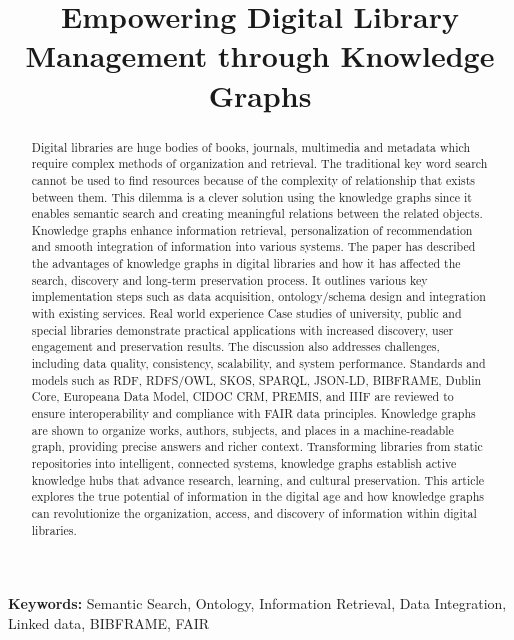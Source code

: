 \documentclass[12pt,a4paper]{article}
\title{Empowering Digital Library Management through Knowledge Graphs}
\author{}
\date{}
\begin{document}
\maketitle

\begin{abstract}
Digital libraries are huge bodies of books, journals, multimedia and metadata which require complex methods of organization and retrieval.  The traditional key word search cannot be used to find resources because of the complexity of relationship that exists between them. This dilemma is a clever solution using the knowledge graphs since it enables semantic search and creating meaningful relations between the related objects. Knowledge graphs enhance information retrieval, personalization of recommendation and smooth integration of information into various systems. The paper has described the advantages of knowledge graphs in digital libraries and how it has affected the search, discovery and long-term preservation process. It outlines various key implementation steps such as data acquisition, ontology/schema design and integration with existing services. Real world experience Case studies of university, public and special libraries demonstrate practical applications with increased discovery, user engagement and preservation results. The discussion also addresses challenges, including data quality, consistency, scalability, and system performance. Standards and models such as RDF, RDFS/OWL, SKOS, SPARQL, JSON-LD, BIBFRAME, Dublin Core, Europeana Data Model, CIDOC CRM, PREMIS, and IIIF are reviewed to ensure interoperability and compliance with FAIR data principles. Knowledge graphs are shown to organize works, authors, subjects, and places in a machine-readable graph, providing precise answers and richer context. Transforming libraries from static repositories into intelligent, connected systems, knowledge graphs establish active knowledge hubs that advance research, learning, and cultural preservation. This article explores the true potential of information in the digital age and how knowledge graphs can revolutionize the organization, access, and discovery of information within digital libraries.
\end{abstract}

\textbf{Keywords:} Semantic Search, Ontology, Information Retrieval, Data Integration, Linked data, BIBFRAME, FAIR
\end{document}
